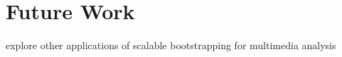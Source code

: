 \section{Future Work}

explore other applications of scalable bootstrapping for multimedia analysis 